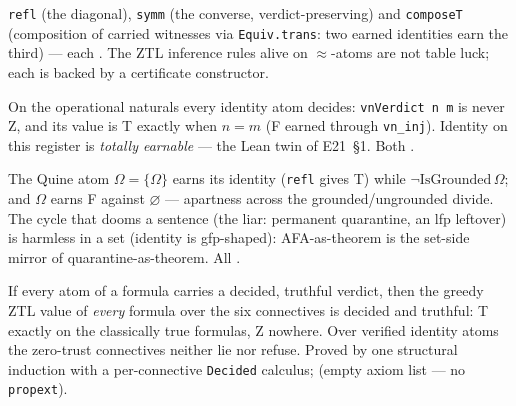\begin{theorem}
\label{thm:setsztl_constructors}
\leanok
{}
\texttt{refl} (the diagonal), \texttt{symm} (the converse, verdict-preserving)
and \texttt{composeT} (composition of carried witnesses via
\texttt{Equiv.trans}: two earned identities earn the third) --- each
\axiomprofile{[]}.  The ZTL inference rules alive on $\approx$-atoms are not
table luck; each is backed by a certificate constructor.
\end{theorem}

\begin{theorem}
\label{thm:setsztl_vn}
\leanok
{}
On the operational naturals every identity atom decides:
\texttt{vnVerdict n m} is never \textsf{Z}, and its value is \textsf{T}
exactly when $n = m$ (\textsf{F} earned through \texttt{vn\_inj}).  Identity
on this register is \emph{totally earnable} --- the Lean twin of E21~\S1.
Both \axiomprofile{[]}.
\end{theorem}

\begin{theorem}
\label{thm:setsztl_orthogonality}
\leanok
{}
The Quine atom $\Omega = \{\Omega\}$ earns its identity
(\texttt{refl} gives \textsf{T}) while $\neg\mathrm{IsGrounded}\,\Omega$;
and $\Omega$ earns \textsf{F} against $\varnothing$ --- apartness across the
grounded/ungrounded divide.  The cycle that dooms a sentence (the liar:
permanent quarantine, an lfp leftover) is harmless in a set (identity is
gfp-shaped): AFA-as-theorem is the set-side mirror of
quarantine-as-theorem.  All \axiomprofile{[]}.
\end{theorem}

\begin{theorem}
\label{thm:setsztl_classical}
\leanok
{}
If every atom of a formula carries a decided, truthful verdict, then the
greedy ZTL value of \emph{every} formula over the six connectives is decided
and truthful: \textsf{T} exactly on the classically true formulas, \textsf{Z}
nowhere.  Over verified identity atoms the zero-trust connectives neither lie
nor refuse.  Proved by one structural induction with a per-connective
\texttt{Decided} calculus; \axiomprofile{[]} (empty axiom list --- no
\texttt{propext}).
\end{theorem}

